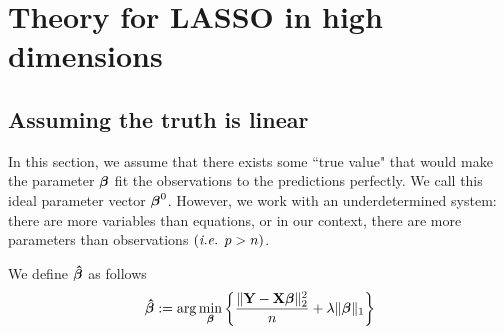 \chapter{Theory for LASSO in high dimensions}


\section{Assuming the truth is linear}
In this section, we assume that there exists some ``true value" that would make the parameter \(\boldsymbol{\beta}\) fit the observations to the predictions perfectly. We call this ideal parameter vector \(\boldsymbol{\beta}^0\). However, we work with an underdetermined system: there are more variables than equations, or in our context, there are more parameters than observations \((\textit{i.e. } p>n)\).

We define $\boldsymbol{\hat{\beta}}$ as follows
\begin{equation}
    \label{eqn: beta hat (LASSO)}
    \boldsymbol{\hat{\beta}}:=\arg \min _{\boldsymbol{\beta}}\left\{ \frac{\|\mathbf{Y}-\mathbf{X} \boldsymbol{\beta}\|_{2}^{2}}{n}+\lambda\|\boldsymbol{\beta}\|_{1} \right\}
\end{equation}

